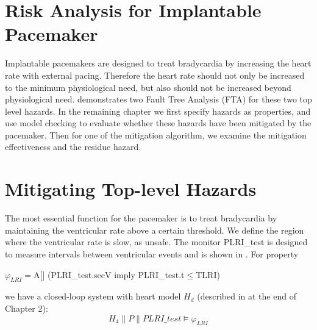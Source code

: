 %
%
\section{Risk Analysis for Implantable Pacemaker}
Implantable pacemakers are designed to treat bradycardia by increasing the heart rate with external pacing. Therefore the heart rate should not only be increased to the minimum physiological need, but also should not be increased beyond physiological need.  demonstrates two Fault Tree Analysis (FTA) for these two top level hazards. In the remaining chapter we first specify hazards as properties, and use model checking to evaluate whether these hazards have been mitigated by the pacemaker. Then for one of the mitigation algorithm, we examine the mitigation effectiveness and the residue hazard.

\section{Mitigating Top-level Hazards}
The most essential function for the pacemaker is to treat bradycardia by maintaining the ventricular rate above a certain threshold. We define the region where the ventricular rate is slow, as \textsf{unsafe}. The monitor \textsf{PLRI\_test} is designed to measure intervals between ventricular events and is shown in . For property
\begin{center}
\textsf{$\varphi_{LRI}=$A[] (PLRI\_test.secV imply PLRI\_test.t$\leq$TLRI)}
\end{center}
we have a closed-loop system  with heart model $H_d$ (described in at the end of Chapter 2): 
$$H_4\| P\| PLRI\_test\models\varphi_{LRI}$$

